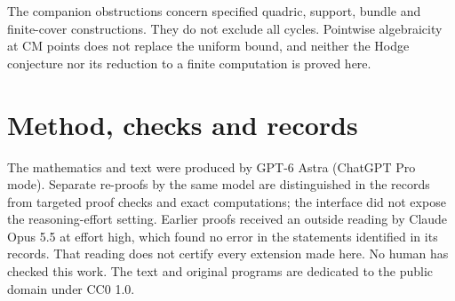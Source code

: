 \documentclass[11pt]{article}
\theoremstyle{definition}
\theoremstyle{remark}
\begin{document}
The companion obstructions concern specified quadric, support, bundle
and finite-cover constructions. They do not exclude all cycles.
Pointwise algebraicity at CM points does not replace the uniform bound,
and neither the Hodge conjecture nor its reduction to a finite
computation is proved here.

\section*{Method, checks and records}
The mathematics and text were produced by GPT-6 Astra (ChatGPT Pro
mode). Separate re-proofs by the same model are distinguished in the
records from targeted proof checks and exact computations; the interface
did not expose the reasoning-effort setting. Earlier proofs received
an outside reading by Claude Opus 5.5 at effort high, which found no
error in the statements identified in its records. That reading does
not certify every extension made here. No human has checked this work.
The text and original programs are dedicated to the public domain
under CC0 1.0.
\end{document}

